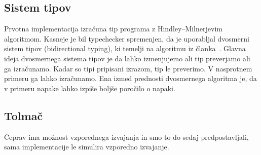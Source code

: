 \subsection{Sistem tipov}\label{sec:tipi}

Prvotna implementacija izračuna tip programa z Hindley–Milnerjevim algoritmom. 
Kasneje je bil typechecker spremenjen, da je uporabljal dvosmerni sistem tipov (bidirectional typing), ki temelji na algoritmu iz članka~\cite{bidirectional}.
Glavna ideja dvosmernega sistema tipov je da lahko izmenjujemo ali tip preverjamo ali ga izračunamo. Kadar so tipi pripisani izrazom, tip le preverimo. V nasprotnem primeru ga lahko izračunamo. Ena izmed prednosti dvosmernega algoritma je, da v primeru napake lahko izpiše boljše poročilo o napaki. 

\subsection{Tolmač}\label{sec:interpreter}

Čeprav ima \aeff{} možnost vzporednega izvajanja in smo to do sedaj predpostavljali, sama implementacije le simulira vzporedno izvajanje.
